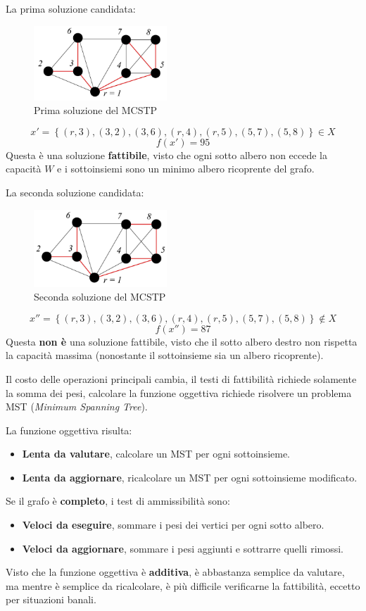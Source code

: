 \documentclass{article}
\begin{document}
La prima soluzione candidata:

\begin{figure}[H]
    \centering
    \includegraphics[width=5cm]{images/MCSTP_fst_sol.png}
    \caption{Prima soluzione del MCSTP}
    \label{fig:fst_sol_MCSTP}
\end{figure}

$$x'=\left\{(r,3),(3,2),(3,6),(r,4),(r,5),(5,7),(5,8)\right\}\in X$$
$$f(x')=95$$
Questa è una soluzione \textbf{fattibile}, visto che ogni sotto albero non eccede la
capacità $W$ e i sottoinsiemi sono un minimo albero ricoprente del grafo.

La seconda soluzione candidata:

\begin{figure}[H]
    \centering
    \includegraphics[width=5cm]{images/MCSTP_snd_sol.png}
    \caption{Seconda soluzione del MCSTP}
    \label{fig:snd_sol_MCSTP}
\end{figure}

$$x''=\left\{(r,3),(3,2),(3,6),(r,4),(r,5),(5,7),(5,8)\right\}\notin X$$
$$f(x'')=87$$
Questa \textbf{non è} una soluzione fattibile, visto che il sotto albero destro non rispetta
la capacità massima (nonostante il sottoinsieme sia un albero ricoprente).

Il costo delle operazioni principali cambia, il testi di fattibilità richiede solamente la somma
dei pesi, calcolare la funzione oggettiva richiede risolvere un problema
MST (\textit{Minimum Spanning Tree}).

La funzione oggettiva risulta:
\begin{itemize}
    \item \textbf{Lenta da valutare}, calcolare un MST per ogni sottoinsieme.
    \item \textbf{Lenta da aggiornare}, ricalcolare un MST per ogni sottoinsieme modificato.
\end{itemize}
Se il grafo è \textbf{completo}, i test di ammissibilità sono:
\begin{itemize}
    \item \textbf{Veloci da eseguire}, sommare i pesi dei vertici per ogni sotto albero.
    \item \textbf{Veloci da aggiornare}, sommare i pesi aggiunti e sottrarre quelli rimossi.
\end{itemize}
Visto che la funzione oggettiva è \textbf{additiva}, è abbastanza semplice da valutare, ma mentre
è semplice da ricalcolare, è più difficile verificarne la fattibilità, eccetto per situazioni banali.
\end{document}
